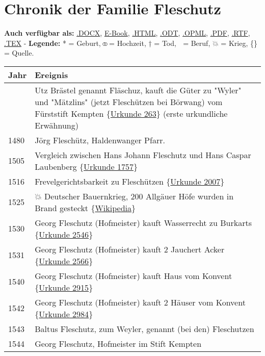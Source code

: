 \documentclass[
]{article}
\author{}
\date{}
\begin{document}
\section{Chronik der Familie Fleschutz}\label{header-n0}

\textbf{Auch verfügbar als:} \href{Export/Chronik.docx}{.DOCX},
\href{Export/Chronik.epub}{E-Book}, \href{Export/Chronik.html}{.HTML},
\href{Export/Chronik.odt}{.ODT}, \href{Export/Chronik.opml}{.OPML},
\href{Export/Chronik.pdf}{.PDF}, \href{Export/Chronik.rtf}{.RTF},
\href{Export/Chronik.tex}{.TEX} - \textbf{Legende:} * = Geburt, ⚭ =
Hochzeit, † = Tod, 🔨 = Beruf, 💥 = Krieg, \{\} = Quelle.

\begin{longtable}[]{@{}ll@{}}
\toprule\noalign{}
Jahr & Ereignis \\
\midrule\noalign{}
\endhead
\bottomrule\noalign{}
\endlastfoot
1412 & Utz Brästel genannt Fläschuz, kauft die Güter zu "Wyler" und
"Mätzlins" (jetzt Fleschützen bei Börwang) vom Fürststift Kempten
\{\href{Quellen/Fuerststift_Kempten/Urkunde_263/}{Urkunde 263}\} (erste
urkundliche Erwähnung) \\
1480 & Jörg Fleschütz, Haldenwanger Pfarr. \\
1505 & Vergleich zwischen Hans Johann Fleschutz und Hans Caspar
Laubenberg \{\href{Quellen/Fuerststift_Kempten/Urkunde_1757/}{Urkunde
1757}\} \\
1516 & Frevelgerichtsbarkeit zu Fleschützen
\{\href{Quellen/Fuerststift_Kempten/Urkunde_2007/}{Urkunde 2007}\} \\
1525 & 💥 Deutscher Bauernkrieg, 200 Allgäuer Höfe wurden in Brand
gesteckt
\{\href{Quellen/Wikipedia/Deutscher_Bauernkrieg/}{Wikipedia}\} \\
1530 & Georg Fleschutz (Hofmeister) kauft Wasserrecht zu Burkarts
\{\href{Quellen/Fuerststift_Kempten/Urkunde_2546/}{Urkunde 2546}\} \\
1531 & Georg Fleschutz (Hofmeister) kauft 2 Jauchert Acker
\{\href{Quellen/Fuerststift_Kempten/Urkunde_2566/}{Urkunde 2566}\} \\
1540 & Georg Fleschutz (Hofmeister) kauft Haus vom Konvent
\{\href{Quellen/Fuerststift_Kempten/Urkunde_2915/}{Urkunde 2915}\} \\
1542 & Georg Fleschutz (Hofmeister) kauft 2 Häuser vom Konvent
\{\href{Quellen/Fuerststift_Kempten/Urkunde_2984}{Urkunde 2984}\} \\
1543 & Baltus Fleschutz, zum Weyler, genannt (bei den) Fleschutzen \\
1544 & Georg Fleschutz, Hofmeister im Stift Kempten \\

\end{longtable}
\end{document}
